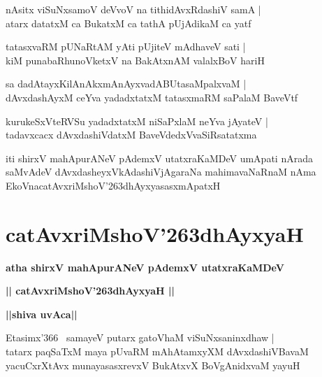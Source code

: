 \documentclass[twoside,12pt,openright]{book}
\def\S{\char'263}
\newcounter{shloka}[chapter]
\def\uvaca#1{\centerline{{\large\textbf{#1}}}}
\begin{document}
\begin{shloka}%
nAsitx viSuNxsamoV deVvoV na tithidAvxRdashiV samA |\\
atarx datatxM ca BukatxM ca tathA pUjAdikaM ca yatf
\end{shloka}

\begin{shloka}%
tatasxvaRM pUNaRtAM yAti pUjiteV mAdhaveV sati |\\
kiM punabaRhunoVketxV na BakAtxnAM valalxBoV hariH
\end{shloka}

\begin{shloka}%
sa dadAtayxKilAnAkxmAnAyxvadABUtasaMpalxvaM |\\
dAvxdashAyxM ceYva yadadxtatxM tatasxmaRM saPalaM BaveVtf
\end{shloka}

\begin{shloka}%
kurukeSxVteRVSu yadadxtatxM niSaPxlaM neYva jAyateV |\\
tadavxcacx dAvxdashiVdatxM BaveVdedxVvaSiRsatatxma
\end{shloka}

\begin{center}
 iti shirxV mahApurANeV pAdemxV utatxraKaMDeV umApati nArada saMvAdeV dAvxdasheyxVkAdashiVjAgaraNa 
 mahimavaNaRnaM nAma EkoVnacatAvxriMshoV\S dhAyxyasasxmApatxH
\end{center}

\chapter{catAvxriMshoV\S dhAyxyaH}

\begin{center}
{\LARGE\bfseries atha shirxV mahApurANeV pAdemxV utatxraKaMDeV}
\end{center}

\begin{center}
{\LARGE\bfseries || catAvxriMshoV\S dhAyxyaH ||}
\end{center}

\uvaca{||shiva uvAca||}

\begin{shloka}%
Etasimx\char'366 ~samayeV putarx gatoVhaM viSuNxsaninxdhaw |\\
tatarx paqSaTxM maya pUvaRM mAhAtamxyXM dAvxdashiVBavaM \\
yacuCxrXtAvx munayasasxrevxV BukAtxvX BoVgAnidxvaM yayuH
\end{shloka}
\end{document}
